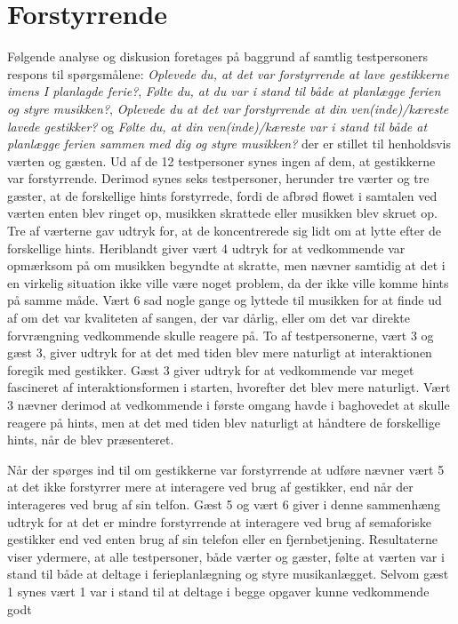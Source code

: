 \section{Forstyrrende}
\label{TestresultaterSocialAcceptForstyrrende}
%
Følgende analyse og diskusion foretages på baggrund af samtlig testpersoners respons til spørgsmålene: \textit{Oplevede du, at det var forstyrrende at lave gestikkerne imens I planlagde ferie?}, \textit{Følte du, at du var i stand til både at planlægge ferien og styre musikken?}, \textit{Oplevede du at det var forstyrrende at din ven(inde)/kæreste lavede gestikker?} og \textit{Følte du, at din ven(inde)/kæreste var i stand til både at planlægge ferien sammen med dig og styre musikken?} der er stillet til henholdsvis værten og gæsten. \blankline
%
Ud af de 12 testpersoner synes ingen af dem, at gestikkerne var forstyrrende. Derimod synes seks testpersoner, herunder tre værter og tre gæster, at de forskellige hints forstyrrede, fordi de afbrød flowet i samtalen ved værten enten blev ringet op, musikken skrattede eller musikken blev skruet op. Tre af værterne gav udtryk for, at de koncentrerede sig lidt om at lytte efter de forskellige hints. Heriblandt giver vært 4 udtryk for at vedkommende var opmærksom på om musikken begyndte at skratte, men nævner samtidig at det i en virkelig situation ikke ville være noget problem, da der ikke ville komme hints på samme måde. Vært 6 sad nogle gange og lyttede til musikken for at finde ud af om det var kvaliteten af sangen, der var dårlig, eller om det var direkte forvrængning vedkommende skulle reagere på. To af testpersonerne, vært 3 og gæst 3, giver udtryk for at det med tiden blev mere naturligt at interaktionen foregik med gestikker. Gæst 3 giver udtryk for at vedkommende var meget fascineret af interaktionsformen i starten, hvorefter det blev mere naturligt. Vært 3 nævner derimod at vedkommende i første omgang havde i baghovedet at skulle reagere på hints, men at det med tiden blev naturligt at håndtere de forskellige hints, når de blev præsenteret. 

Når der spørges ind til om gestikkerne var forstyrrende at udføre nævner vært 5 at det ikke forstyrrer mere at interagere ved brug af gestikker, end når der interageres ved brug af sin telfon. Gæst 5 og vært 6 giver i denne sammenhæng udtryk for at det er mindre forstyrrende at interagere ved brug af semaforiske gestikker end ved enten brug af sin telefon eller en fjernbetjening. \blankline
%
Resultaterne viser ydermere, at alle testpersoner, både værter og gæster, følte at værten var i stand til både at deltage i ferieplanlægning og styre musikanlægget. Selvom gæst 1 synes vært 1 var i stand til at deltage i begge opgaver kunne vedkommende godt 


